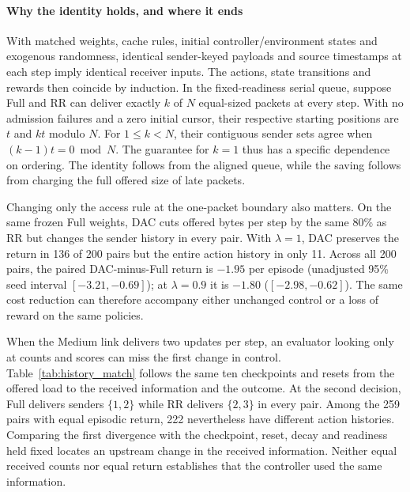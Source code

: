 \documentclass[a4paper,fleqn]{cas-dc}
\begin{document}
\paragraph{Why the identity holds, and where it ends}
With matched weights, cache rules, initial controller/environment states and exogenous randomness, identical sender-keyed payloads and source timestamps at each step imply identical receiver inputs. The actions, state transitions and rewards then coincide by induction. In the fixed-readiness serial queue, suppose Full and RR can deliver exactly $k$ of $N$ equal-sized packets at every step. With no admission failures and a zero initial cursor, their respective starting positions are $t$ and $kt$ modulo $N$. For $1\leq k<N$, their contiguous sender sets agree when $(k-1)t=0\bmod N$. The guarantee for $k=1$ thus has a specific dependence on ordering. The identity follows from the aligned queue, while the saving follows from charging the full offered size of late packets.

Changing only the access rule at the one-packet boundary also matters. On the same frozen Full weights, DAC cuts offered bytes per step by the same 80\% as RR but changes the sender history in every pair. With $\lambda=1$, DAC preserves the return in 136 of 200 pairs but the entire action history in only 11. Across all 200 pairs, the paired DAC-minus-Full return is $-1.95$ per episode (unadjusted 95\% seed interval $[-3.21,-0.69]$); at $\lambda=0.9$ it is $-1.80$ ($[-2.98,-0.62]$). The same cost reduction can therefore accompany either unchanged control or a loss of reward on the same policies.

When the Medium link delivers two updates per step, an evaluator looking only at counts and scores can miss the first change in control. Table~\ref{tab:history_match} follows the same ten checkpoints and resets from the offered load to the received information and the outcome. At the second decision, Full delivers senders $\{1,2\}$ while RR delivers $\{2,3\}$ in every pair. Among the 259 pairs with equal episodic return, 222 nevertheless have different action histories. Comparing the first divergence with the checkpoint, reset, decay and readiness held fixed locates an upstream change in the received information. Neither equal received counts nor equal return establishes that the controller used the same information.
\end{document}
